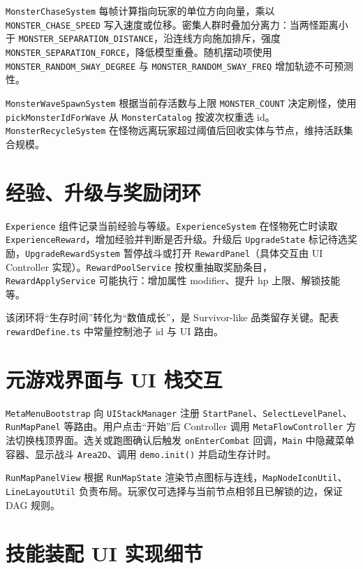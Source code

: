 \texttt{MonsterChaseSystem} 每帧计算指向玩家的单位方向向量，乘以 \texttt{MONSTER\_CHASE\_SPEED} 写入速度或位移。密集人群时叠加分离力：当两怪距离小于 \texttt{MONSTER\_SEPARATION\_DISTANCE}，沿连线方向施加排斥，强度 \texttt{MONSTER\_SEPARATION\_FORCE}，降低模型重叠。随机摆动项使用 \texttt{MONSTER\_RANDOM\_SWAY\_DEGREE} 与 \texttt{MONSTER\_RANDOM\_SWAY\_FREQ} 增加轨迹不可预测性。

\texttt{MonsterWaveSpawnSystem} 根据当前存活数与上限 \texttt{MONSTER\_COUNT} 决定刷怪，使用 \texttt{pickMonsterIdForWave} 从 \texttt{MonsterCatalog} 按波次权重选 id。\texttt{MonsterRecycleSystem} 在怪物远离玩家超过阈值后回收实体与节点，维持活跃集合规模。

\section{经验、升级与奖励闭环}

\texttt{Experience} 组件记录当前经验与等级。\texttt{ExperienceSystem} 在怪物死亡时读取 \texttt{ExperienceReward}，增加经验并判断是否升级。升级后 \texttt{UpgradeState} 标记待选奖励，\texttt{UpgradeRewardSystem} 暂停战斗或打开 \texttt{RewardPanel}（具体交互由 UI Controller 实现）。\texttt{RewardPoolService} 按权重抽取奖励条目，\texttt{RewardApplyService} 可能执行：增加属性 modifier、提升 hp 上限、解锁技能等。

该闭环将“生存时间”转化为“数值成长”，是 Survivor-like 品类留存关键\cite{gregory2018game}。配表 \texttt{rewardDefine.ts} 中常量控制池子 id 与 UI 路由。

\section{元游戏界面与 UI 栈交互}

\texttt{MetaMenuBootstrap} 向 \texttt{UIStackManager} 注册 \texttt{StartPanel}、\texttt{SelectLevelPanel}、\texttt{RunMapPanel} 等路由。用户点击“开始”后 Controller 调用 \texttt{MetaFlowController} 方法切换栈顶界面。选关或跑图确认后触发 \texttt{onEnterCombat} 回调，\texttt{Main} 中隐藏菜单容器、显示战斗 \texttt{Area2D}、调用 \texttt{demo.init()} 并启动生存计时。

\texttt{RunMapPanelView} 根据 \texttt{RunMapState} 渲染节点图标与连线，\texttt{MapNodeIconUtil}、\texttt{LineLayoutUtil} 负责布局。玩家仅可选择与当前节点相邻且已解锁的边，保证 DAG 规则。

\section{技能装配 UI 实现细节}

